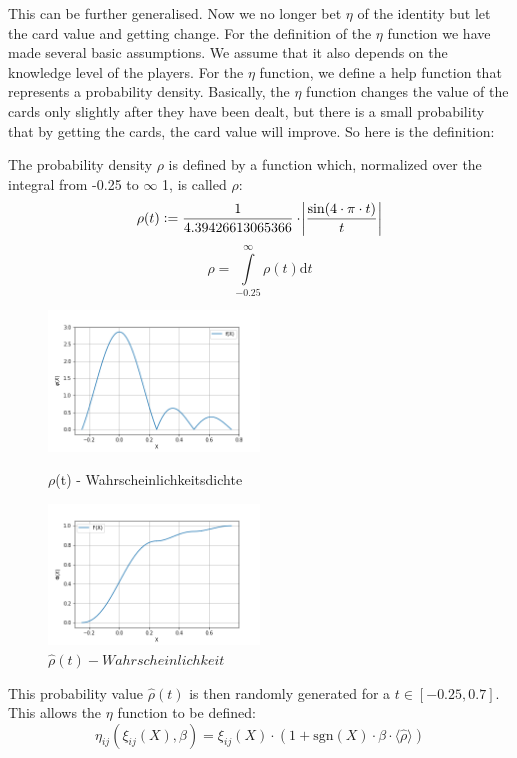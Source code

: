 This can be further generalised. Now we no longer bet $\eta$ of the identity but let the card value and getting change. For the definition of the $\eta$ function we have made several basic assumptions. We assume that it also depends on the knowledge level of the players. For the $\eta$ function, we define a help function that represents a probability density. Basically, the $\eta$ function changes the value of the cards only slightly after they have been dealt, but there is a small probability that by getting the cards, the card value will improve. So here is the definition:
\begin{definition}
The probability density $\rho$ is defined by a function which, normalized over the integral from -0.25 to $\infty$ 1, is called $\hat{\rho}$:
$$
\rho (t) := \frac{1}{4.39426613065366}\cdot\abs{\frac{\sin(4\cdot\pi\cdot t)}{t}}
$$
$$
\widehat{\rho} = \int\limits_{-0.25}^{\infty}\rho (t)\mathrm{d} t
$$
\end{definition}
\begin{figure}[h]
    \centering
    \includegraphics[width=0.5\textwidth]{Bilder/b1_e}
    \caption{$\rho$(t) - Wahrscheinlichkeitsdichte}
    \label{fig:meine-grafik}
    \centering
    \includegraphics[width=0.5\textwidth]{Bilder/b1_f}
    \caption{$\widehat{\rho}(t) - Wahrscheinlichkeit$}
    \label{fig:meine-grafik}
\end{figure}
This probability value $\hat{\rho}(t)$ is then randomly generated for a $t\in [-0.25,0.7]$. This allows the $\eta$ function to be defined:
\begin{equation*}
\eta_{ij}(\xi_{ij}(X),\beta) = \xi_{ij}(X)\cdot(1+\mathrm{sgn}(X)\cdot\beta\cdot\langle\widehat{\rho}\rangle)
\end{equation*}
